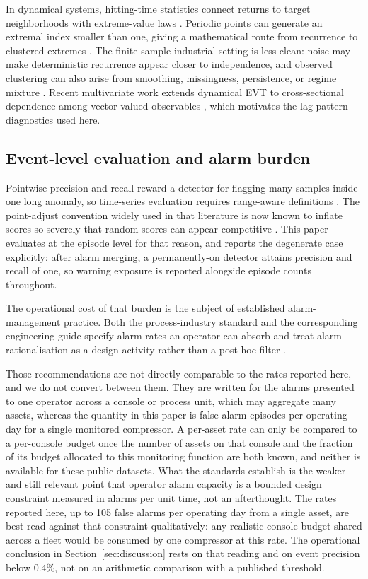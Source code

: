 In dynamical systems, hitting-time statistics connect returns to target neighborhoods with extreme-value laws \citep{Freitas2008Hitting}. Periodic points can generate an extremal index smaller than one, giving a mathematical route from recurrence to clustered extremes \citep{Freitas2012Periodicity}. The finite-sample industrial setting is less clean: noise may make deterministic recurrence appear closer to independence, and observed clustering can also arise from smoothing, missingness, persistence, or regime mixture \citep{Faranda2013Noise}. Recent multivariate work extends dynamical EVT to cross-sectional dependence among vector-valued observables \citep{Aimino2024Multivariate}, which motivates the lag-pattern diagnostics used here.

\subsection{Event-level evaluation and alarm burden}

Pointwise precision and recall reward a detector for flagging many samples inside one long anomaly, so time-series evaluation requires range-aware definitions \citep{Tatbul2018PrecisionRecall}. The point-adjust convention widely used in that literature is now known to inflate scores so severely that random scores can appear competitive \citep{Kim2022RigorousEvaluation}. This paper evaluates at the episode level for that reason, and reports the degenerate case explicitly: after alarm merging, a permanently-on detector attains precision and recall of one, so warning exposure is reported alongside episode counts throughout.

The operational cost of that burden is the subject of established alarm-management practice. Both the process-industry standard and the corresponding engineering guide specify alarm rates an operator can absorb and treat alarm rationalisation as a design activity rather than a post-hoc filter \citep{ISA182AlarmManagement, EEMUA191AlarmSystems}.

Those recommendations are not directly comparable to the rates reported here, and we do not convert between them. They are written for the alarms presented to one operator across a console or process unit, which may aggregate many assets, whereas the quantity in this paper is false alarm episodes per operating day for a single monitored compressor. A per-asset rate can only be compared to a per-console budget once the number of assets on that console and the fraction of its budget allocated to this monitoring function are both known, and neither is available for these public datasets. What the standards establish is the weaker and still relevant point that operator alarm capacity is a bounded design constraint measured in alarms per unit time, not an afterthought. The rates reported here, up to 105 false alarms per operating day from a single asset, are best read against that constraint qualitatively: any realistic console budget shared across a fleet would be consumed by one compressor at this rate. The operational conclusion in Section~\ref{sec:discussion} rests on that reading and on event precision below \(0.4\%\), not on an arithmetic comparison with a published threshold.

